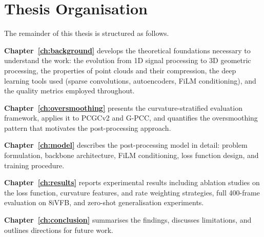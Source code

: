 \section{Thesis Organisation}

The remainder of this thesis is structured as follows.

\textbf{Chapter~\ref{ch:background}} develops the theoretical foundations
necessary to understand the work: the evolution from 1D signal processing to
3D geometric processing, the properties of point clouds and their compression,
the deep learning tools used (sparse convolutions, autoencoders, FiLM
conditioning), and the quality metrics employed throughout.

\textbf{Chapter~\ref{ch:oversmoothing}} presents the curvature-stratified
evaluation framework, applies it to PCGCv2 and G-PCC, and quantifies the
oversmoothing pattern that motivates the post-processing approach.

\textbf{Chapter~\ref{ch:model}} describes the post-processing model in detail:
problem formulation, backbone architecture, FiLM conditioning, loss function
design, and training procedure.

\textbf{Chapter~\ref{ch:results}} reports experimental results including ablation
studies on the loss function, curvature features, and rate weighting strategies,
full 400-frame evaluation on 8iVFB, and zero-shot generalisation experiments.

\textbf{Chapter~\ref{ch:conclusion}} summarises the findings, discusses
limitations, and outlines directions for future work.
